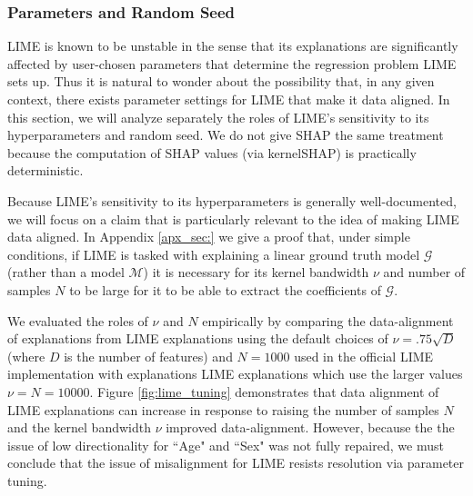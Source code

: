 \documentclass[mnsc,blindrev]{informs3}
\begin{document}



        
        \subsubsection{Parameters and Random Seed} 
            \label{sec:lime_params}
             LIME is known to be unstable in the sense that its explanations are significantly affected by user-chosen parameters that determine the regression problem LIME sets up. Thus it is natural to wonder about the possibility that, in any given context, there exists parameter settings for LIME that make it data aligned. In this section, we will analyze separately the roles of LIME's sensitivity to its hyperparameters and random seed. We do not give SHAP the same treatment because the computation of SHAP values (via kernelSHAP) is practically deterministic.
             
             Because LIME's sensitivity to its hyperparameters is generally well-documented, we will focus on a claim that is particularly relevant to the idea of making LIME data aligned. In Appendix \ref{apx_sec:} we give a proof that, under simple conditions, if LIME is tasked with explaining a linear ground truth model $\mathcal{G}$ (rather than a model $\mathcal{M}$) it is necessary for its kernel bandwidth $\nu$ and number of samples $N$ to be large for it to be able to extract the coefficients of $\mathcal{G}$. 
             
             We evaluated the roles of $\nu$ and $N$ empirically by comparing the data-alignment of explanations from LIME explanations using the default choices of $\nu = .75\sqrt{D}$ (where $D$ is the number of features) and $N=1000$ used in the official LIME implementation \citep{ribeiro16lime} with explanations LIME explanations which use the larger values $\nu=N=10000$. Figure \ref{fig:lime_tuning} demonstrates that data alignment of LIME explanations can increase in response to raising the number of samples $N$ and the kernel bandwidth $\nu$ improved data-alignment. However, because the the issue of low directionality for ``Age" and ``Sex" was not fully repaired, we must conclude that the issue of misalignment for LIME resists resolution via parameter tuning.  %
        
\end{document}

